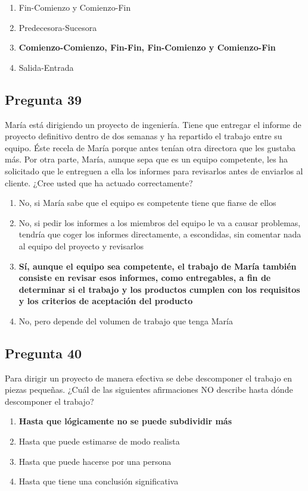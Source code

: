 \documentclass[11pt,a4paper]{article}
\begin{document}
\begin{enumerate}[label=\alph*)]
  \item Fin-Comienzo y Comienzo-Fin
  \item Predecesora-Sucesora
  \item \textbf{Comienzo-Comienzo, Fin-Fin, Fin-Comienzo y Comienzo-Fin}
  \item Salida-Entrada
\end{enumerate}

\subsection*{Pregunta 39}
María está dirigiendo un proyecto de ingeniería. Tiene que entregar el informe de proyecto definitivo dentro de dos semanas y ha repartido el trabajo entre su equipo. Éste recela de María porque antes tenían otra directora que les gustaba más. Por otra parte, María, aunque sepa que es un equipo competente, les ha solicitado que le entreguen a ella los informes para revisarlos antes de enviarlos al cliente. ¿Cree usted que ha actuado correctamente?

\begin{enumerate}[label=\alph*)]
  \item No, si María sabe que el equipo es competente tiene que fiarse de ellos
  \item No, si pedir los informes a los miembros del equipo le va a causar problemas, tendría que coger los informes directamente, a escondidas, sin comentar nada al equipo del proyecto y revisarlos
  \item \textbf{Sí, aunque el equipo sea competente, el trabajo de María también consiste en revisar esos informes, como entregables, a fin de determinar si el trabajo y los productos cumplen con los requisitos y los criterios de aceptación del producto}
  \item No, pero depende del volumen de trabajo que tenga María
\end{enumerate}

\subsection*{Pregunta 40}
Para dirigir un proyecto de manera efectiva se debe descomponer el trabajo en piezas pequeñas. ¿Cuál de las siguientes afirmaciones NO describe hasta dónde descomponer el trabajo?

\begin{enumerate}[label=\alph*)]
  \item \textbf{Hasta que lógicamente no se puede subdividir más}
  \item Hasta que puede estimarse de modo realista
  \item Hasta que puede hacerse por una persona
  \item Hasta que tiene una conclusión significativa
\end{enumerate}
\end{document}
